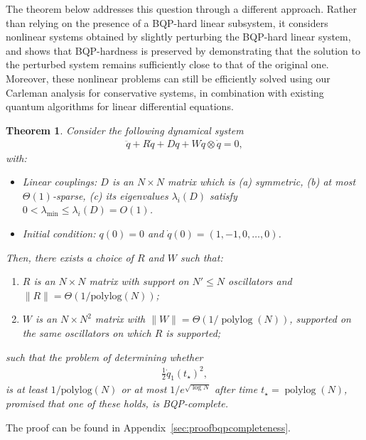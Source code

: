 \documentclass[superscriptaddress,onecolumn,nofootinbib,longbibliography,a4paper,accepted=2026-09-29]{quantumarticle}
\theoremstyle{plain}
\newtheorem{thm}{Theorem}
\theoremstyle{definition}
\numberwithin{thm}{section}
\numberwithin{assumption}{section}
\numberwithin{lemma}{section}
\numberwithin{prop}{section}
\numberwithin{cor}{section}
\numberwithin{definition}{section}
\numberwithin{rmk}{section}
\numberwithin{equation}{section}
\newcommand{\lrb}[1]{\left ( #1 \right )}
\newcommand{\mypolylog}[1]{\operatorname{polylog} \lrb{#1}}
\begin{document}
The theorem below addresses this question through a different approach. Rather than relying on the presence of a BQP-hard linear subsystem, it considers nonlinear systems obtained by slightly perturbing the BQP-hard linear system, and shows that BQP-hardness is preserved by demonstrating that the solution to the perturbed system remains sufficiently close to that of the original one. Moreover, these nonlinear problems can still be efficiently solved using our Carleman analysis for conservative systems, in combination with existing quantum algorithms for linear differential equations.


\begin{thm}
\label{thm:bqp}
    Consider the following dynamical system
\begin{align}
\label{eq:bqpproblem}
    \ddot{q} + R \dot{q} + D q + W \dot{q} \otimes \dot{q} =0, 
\end{align}
with:
\begin{itemize}
    \item Linear couplings: $D$ is an $N \times N$ matrix which is (a) symmetric, (b) {at most $\Theta(1)$-sparse, (c) its eigenvalues $\lambda_{i}(D)$ satisfy $ 0< \lambda_{\mathrm{min}} \leq \lambda_{i}(D) = O(1)$.}
    \item Initial condition: $q(0) = 0$ and $\dot{q}(0) = (1,-1,0,\dots, 0)$.
\end{itemize}  

Then, there exists a choice of $R$ and $W$ such that:
\begin{enumerate}
    \item $R$ is an $N \times N$ matrix with support on  $N' \leq N$ oscillators and $\|R\| = \Theta(1/\mathrm{polylog}(N))$;
    \item $W$ is an $N \times N^2$ matrix with $\|W\| = \Theta(1/\mypolylog{N})$, supported on the same oscillators on which $R$ is supported;
\end{enumerate}
such that the problem of determining whether 
\begin{align}
 \frac{1}{2} \dot{q}_1(t_\star)^2, 
\end{align}
is at least $1/\mathrm{polylog}(N)$ or at most $1/e^{\sqrt{\log N}}$ after time $t_\star= \mypolylog{N}$, promised that one of these holds, is BQP-complete.
\end{thm} 

The proof can be found in Appendix~\ref{sec:proofbqpcompleteness}.

\end{document}
